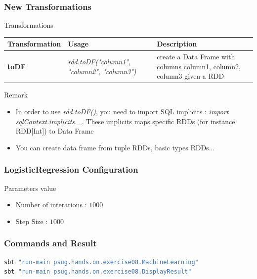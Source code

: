 \documentclass[slidetop,9pt,utf8]{beamer}
\begin{document}
\begin{CJK}{UTF8}{gbsn}
\begin{frame}
  \frametitle{New Transformations}

  \begin{block}{Transformations}
    \begin{center}
      \begin{tabular}{|m{2.1cm}|m{3.5cm}|m{5cm}|}
        \hline 
        \rowcolor{gray} \textbf{Transformation} & \textbf{Usage} & \textbf{Description} \\ \hline
        \textbf{toDF} & \textit{rdd.toDF("column1", "column2", "column3")} & create a Data Frame with columns column1, column2, column3 given a RDD \\ \hline
      \end{tabular}
    \end{center}
  \end{block}

  \begin{block}{Remark}
    \begin{itemize}
      \item In order to use \textit{rdd.toDF()}, you need to import SQL implicits : \textit{import sqlContext.implicits.\_}. These implicits maps specific RDDs (for instance RDD[Int]) to Data Frame
      \item You can create data frame from tuple RDDs, basic types RDDs...
    \end{itemize}
  \end{block}

\end{frame}

\begin{frame}
  \frametitle{LogisticRegression Configuration}

  \begin{block}{Parameters value}
    \begin{itemize}
      \item Number of interations : $1000$
      \item Step Size : $1000$
    \end{itemize}
  \end{block}

\end{frame}

\begin{frame}[fragile]

  \frametitle{Commands and Result}
     
    \begin{lstlisting}[language=bash, style=terminal-medium]
sbt "run-main psug.hands.on.exercise08.MachineLearning"
sbt "run-main psug.hands.on.exercise08.DisplayResult"    
    \end{lstlisting}


\end{frame}
\end{CJK}
\end{document}
